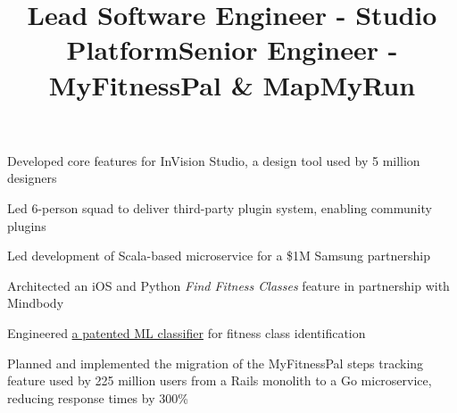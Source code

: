\documentclass[12pt, line]{res}
\let\tempone\itemize
\let\temptwo\enditemize
\renewenvironment{itemize}{%
  \setlength{\topsep}{0pt}%
  \setlength{\partopsep}{0pt}%
  \tempone
  \renewcommand{\labelitemi}{$\bullet$}%
  \vspace{-0.25in}%
  \setlength{\itemsep}{3pt}%
  \setlength{\parsep}{0pt}%
}{%
  \temptwo
}
\begin{document}
\begin{resume}
  \title{Lead Software Engineer - Studio Platform}
  \begin{position}
    \begin{itemize}
      \item Developed core features for InVision Studio, a design tool used by 5 million designers
      \item Led 6-person squad to deliver third-party plugin system, enabling community plugins
    \end{itemize}
  \end{position}

  \title{Senior Engineer - MyFitnessPal \& MapMyRun}
  \begin{position}
    \begin{itemize}
      \item Led development of Scala-based microservice for a \$1M Samsung partnership
      \item Architected an iOS and Python \textit{Find Fitness Classes} feature in partnership with Mindbody
      \item Engineered \href{https://patents.google.com/patent/US20180225367A1/en?oq=20180225367}{a patented ML classifier} for fitness class identification
      \item Planned and implemented the migration of the MyFitnessPal steps tracking feature used by 225 million users from a Rails monolith to a Go microservice, reducing response times by 300\%
    \end{itemize}
  \end{position}


\end{resume}
\end{document}
